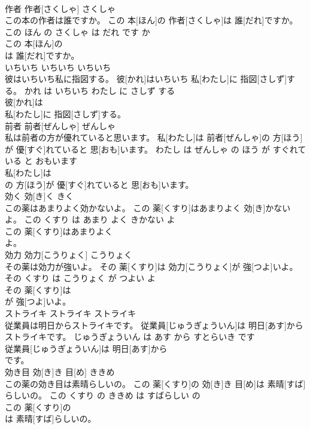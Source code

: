 \documentclass[8pt]{extreport}
\begin{document}
\begin{CJK}{UTF8}{min}
\\	作者	作者[さくしゃ]	さくしゃ	
\\	この本の作者は誰ですか。	この 本[ほん]の 作者[さくしゃ]は 誰[だれ]ですか。	この ほん の さくしゃ は だれ です か	
\\	この 本[ほん]の
\\	は 誰[だれ]ですか。			
\\	いちいち	いちいち	いちいち	
\\	彼はいちいち私に指図する。	彼[かれ]はいちいち 私[わたし]に 指図[さしず]する。	かれ は いちいち わたし に さしず する	
\\	彼[かれ]は
\\	私[わたし]に 指図[さしず]する。			
\\	前者	前者[ぜんしゃ]	ぜんしゃ	
\\	私は前者の方が優れていると思います。	私[わたし]は 前者[ぜんしゃ]の 方[ほう]が 優[すぐ]れていると 思[おも]います。	わたし は ぜんしゃ の ほう が すぐれて いる と おもいます	
\\	私[わたし]は
\\	の 方[ほう]が 優[すぐ]れていると 思[おも]います。			
\\	効く	効[き]く	きく	
\\	この薬はあまりよく効かないよ。	この 薬[くすり]はあまりよく 効[き]かないよ。	この くすり は あまり よく きかない よ	
\\	この 薬[くすり]はあまりよく
\\	よ。			
\\	効力	効力[こうりょく]	こうりょく	
\\	その薬は効力が強いよ。	その 薬[くすり]は 効力[こうりょく]が 強[つよ]いよ。	その くすり は こうりょく が つよい よ	
\\	その 薬[くすり]は
\\	が 強[つよ]いよ。			
\\	ストライキ	ストライキ	ストライキ	
\\	従業員は明日からストライキです。	従業員[じゅうぎょういん]は 明日[あす]からストライキです。	じゅうぎょういん は あす から すとらいき です	
\\	従業員[じゅうぎょういん]は 明日[あす]から
\\	です。			
\\	効き目	効[き]き 目[め]	ききめ	
\\	この薬の効き目は素晴らしいの。	この 薬[くすり]の 効[き]き 目[め]は 素晴[すば]らしいの。	この くすり の ききめ は すばらしい の	
\\	この 薬[くすり]の
\\	は 素晴[すば]らしいの。			

\end{CJK}
\end{document}
